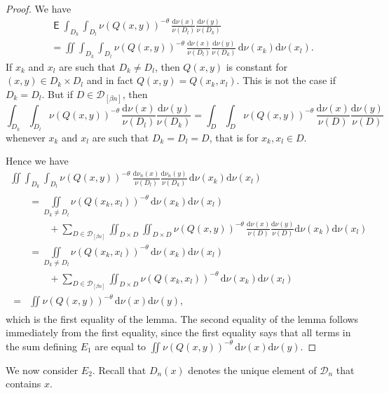 \documentclass[AHL,Unicode,longabstracts]{cedram}
\DeclareMathOperator{\E}{\mathsf{E}}
\newcommand*{\dd}{\mathrm{d}}
\begin{document}
\begin{proof}
We have
\begin{multline*}
\E \int_{D_k} \int_{D_l} \nu (Q(x,y))^{-\theta} \,
\frac{\dd \nu (x)}{\nu (D_l)} \frac{\dd \nu (y)}{\nu (D_k)} \\ = \iint \int_{D_k} \int_{D_l} \nu (Q(x,y))^{-\theta} \, \frac{\dd \nu (x)}{\nu (D_l)}
\frac{\dd \nu (y)}{\nu (D_k)} \, \dd \nu (x_k)
\dd \nu (x_l).
\end{multline*}
If $x_k$ and $x_l$ are such that $D_k \neq D_l$, then $Q(x,y)$ is constant for $(x,y) \in D_k \times D_l$ and in fact $Q(x,y) = Q(x_k,x_l)$. This is not the case if $D_k = D_l$. But if $D \in
\mathscr{D}_{[\beta n]}$, then
\[
\int_{D_k} \int_{D_l} \nu (Q(x,y))^{-\theta} \, \frac{\dd
\nu (x)}{\nu (D_l)} \frac{\dd \nu (y)}{\nu (D_k)} =
\int_D \int_D \nu (Q(x,y))^{-\theta} \, \frac{\dd \nu (x)}{\nu (D)} \frac{\dd \nu (y)}{\nu (D)}
\]
whenever $x_k$ and $x_l$ are such that $D_k = D_l = D$, that is for $x_k, x_l \in D$.

Hence we have
\begin{multline*}
\iint \int_{D_k} \int_{D_l} \nu (Q(x,y))^{-\theta} \,
\frac{\dd \nu_n (x)}{\nu (D_l)} \frac{\dd \nu_n (y)}{\nu (D_k)} \, \dd \nu (x_k) \dd \nu (x_l)\\
\begin{aligned}
&= \iint\limits_{D_k \neq D_l} \nu (Q(x_k,x_l))^{-\theta} \, \dd\nu (x_k) \dd\nu (x_l) \\
&\qquad + \sum_{D \in
\mathscr{D}_{[\beta n]}} \iint_{D\times D} \iint_{D\times D} \nu (Q(x,y))^{-\theta} \, \frac{\dd \nu (x)}{\nu (D)} \frac{\dd \nu (y)}{\nu (D)} \dd \nu (x_k) \dd
\nu (x_l) \\
&= \iint\limits_{D_k \neq D_l} \nu (Q(x_k,x_l))^{-\theta} \, \dd\nu (x_k) \dd\nu (x_l)\\
&\qquad + \sum_{D \in \mathscr{D}_{[\beta n]}} \iint_{D\times D} \nu (Q(x_k,x_l))^{-\theta} \, \dd \nu (x_k) \dd \nu (x_l) \\ = & \iint \nu(Q(x,y))^{-\theta} \, \dd \nu (x)\dd \nu (y),
\end{aligned}
\end{multline*}
which is the first equality of the lemma. The second equality of the lemma follows immediately from the first equality, since the first equality says that all terms in the sum defining $E_1$ are equal to $\iint \nu(Q(x,y))^{-\theta} \, \dd \nu (x) \dd \nu (y)$.
\end{proof}

We now consider $E_2$. Recall that $D_n (x)$ denotes the unique element of $\mathscr{D}_n$ that contains $x$.
\end{document}
